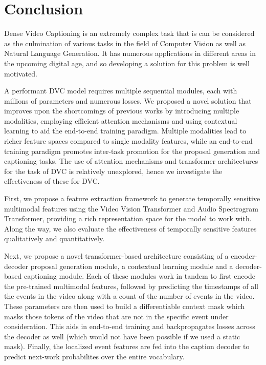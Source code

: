 \section{Conclusion}

\par Dense Video Captioning is an extremely complex task that is can be considered as the culmination of various tasks in the field of Computer Vision as well as Natural Language Generation. It has numerous applications in different areas in the upcoming digital age, and so developing a solution for this problem is well motivated.

\par A performant DVC model requires multiple sequential modules, each with millions of parameters and numerous losses. We proposed a novel solution that improves upon the shortcomings of previous works by introducing multiple modalities, employing efficient attention mechanisms and using contextual learning to aid the end-to-end training paradigm. Multiple modalities lead to richer feature spaces compared to single modality features, while an end-to-end training paradigm promotes inter-task promotion for the proposal generation and captioning tasks. The use of attention mechanisms and transformer architectures for the task of DVC is relatively unexplored, hence we investigate the effectiveness of these for DVC.

\par First, we propose a feature extraction framework to generate temporally sensitive multimodal features using the Video Vision Transformer and Audio Spectrogram Transformer, providing a rich representation space for the model to work with. Along the way, we also evaluate the effectiveness of temporally sensitive features qualitatively and quantitatively.

\par Next, we propose a novel transformer-based architecture consisting of a encoder-decoder proposal generation module, a contextual learning module and a decoder-based captioning module. Each of these modules work in tandem to first encode the pre-trained multimodal features, followed by predicting the timestamps of all the events in the video along with a count of the number of events in the video. These parameters are then used to build a differentiable context mask which masks those tokens of the video that are not in the specific event under consideration. This aids in end-to-end training and backpropagates losses across the decoder as well (which would not have been possible if we used a static mask). Finally, the localized event features are fed into the caption decoder to predict next-work probabilites over the entire vocabulary.

